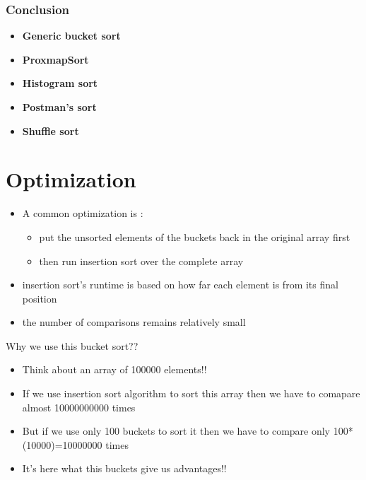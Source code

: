 \documentclass{beamer}
\begin{document}
\begin{frame}
	\frametitle{Conclusion}
	\begin{itemize}
	\item \textbf{Generic bucket sort}
	\item \textbf{ProxmapSort}
	\item \textbf{Histogram sort}
	\item \textbf{Postman's sort}
	\item \textbf{Shuffle sort}
	
	\end{itemize}
\end{frame}


\section{Optimization}
\begin{frame}
\begin{itemize}
\item A common optimization is :
\begin{itemize}
\pause\item put the unsorted elements of the buckets back in the original array first
\pause\item  then run insertion sort over the complete array
\end{itemize}
\pause\item insertion sort's runtime is based on how far each element is from its final position
\pause\item the number of comparisons remains relatively small
\end{itemize}
\end{frame}


\begin{frame}
Why we use this bucket sort??
\begin{itemize}
\pause\item Think about an array of 100000 elements!!
\pause\item If we use insertion sort algorithm to sort this array then we have to comapare almost 10000000000 times
\pause\item But if we use only 100 buckets to sort it then we have to compare only 100*(10000)=10000000 times
\pause\item It's here what this buckets give us advantages!!


\end{itemize}
\end{frame}
\end{document}
